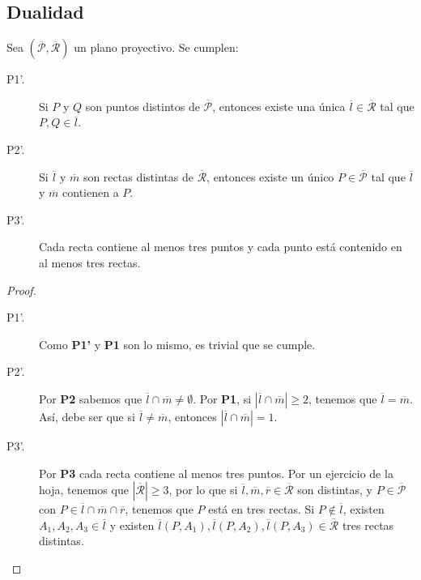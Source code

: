 \subsection{Dualidad}
\begin{prop}
Sea $\displaystyle \left(\overline{\mathcal{P}}, \overline{\mathcal{R}}\right) $ un plano proyectivo. Se cumplen:
\begin{description}
\item[P1'.] Si $\displaystyle P $ y $\displaystyle Q $ son puntos distintos de $\displaystyle \overline{\mathcal{P}} $, entonces existe una única $\displaystyle \overline{l} \in \overline{\mathcal{R}} $ tal que $\displaystyle P,Q \in \overline{l} $.
\item[P2'.] Si $\displaystyle \overline{l} $ y $\displaystyle \overline{m} $ son rectas distintas de $\displaystyle \overline{\mathcal{R}} $, entonces existe un único $\displaystyle P \in \overline{\mathcal{P}} $ tal que $\displaystyle \overline{l} $ y $\displaystyle \overline{m} $ contienen a $\displaystyle P $.
\item[P3'.] Cada recta contiene al menos tres puntos y cada punto está contenido en al menos tres rectas.
\end{description}
\end{prop}
\begin{proof}
\begin{description}
\item[P1'.] Como \textbf{P1'} y \textbf{P1} son lo mismo, es trivial que se cumple.
\item[P2'.] Por \textbf{P2} sabemos que $\displaystyle \overline{l} \cap \overline{m} \neq \emptyset$. Por \textbf{P1}, si $\displaystyle \left|\overline{l} \cap \overline{m}\right|  \geq 2$, tenemos que $\displaystyle \overline{l} = \overline{m} $. Así, debe ser que si $\displaystyle \overline{l} \neq \overline{m} $, entonces $\displaystyle \left|\overline{l} \cap \overline{m}\right| =1 $. 
\item[P3'.] Por \textbf{P3} cada recta contiene al menos tres puntos. Por un ejercicio de la hoja, tenemos que $\displaystyle \left|\overline{\mathcal{R}}\right| \geq 3 $, por lo que si $\displaystyle \overline{l}, \overline{m}, \overline{r} \in \overline{\mathcal{R}}$ son distintas, y $\displaystyle P \in \overline{\mathcal{P}} $ con $\displaystyle P \in \overline{l} \cap \overline{m} \cap \overline{r} $, tenemos que $\displaystyle P $ está en tres rectas. Si $\displaystyle P \not\in \overline{l} $, existen $\displaystyle A_{1}, A_{2}, A_{3} \in \overline{l} $ y existen $\displaystyle \overline{l}\left(P,A_{1}\right), \overline{l}\left(P,A_{2}\right),\overline{l}\left(P,A_{3}\right) \in \overline{\mathcal{R}} $ tres rectas distintas.
\end{description}
\end{proof}
